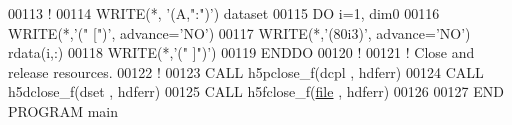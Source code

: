 \begin{DoxyCode}
00113   \textcolor{comment}{!}
00114   \textcolor{keyword}{WRITE}(*, \textcolor{stringliteral}{'(A,":")'}) dataset
00115   \textcolor{keywordflow}{DO} i=1, dim0
00116      \textcolor{keyword}{WRITE}(*,\textcolor{stringliteral}{'(" [")'}, advance=\textcolor{stringliteral}{'NO'})
00117      \textcolor{keyword}{WRITE}(*,\textcolor{stringliteral}{'(80i3)'}, advance=\textcolor{stringliteral}{'NO'}) rdata(i,:)
00118      \textcolor{keyword}{WRITE}(*,\textcolor{stringliteral}{'(" ]")'})
00119 \textcolor{keywordflow}{  ENDDO}
00120   \textcolor{comment}{!}
00121   \textcolor{comment}{! Close and release resources.}
00122   \textcolor{comment}{!}
00123   \textcolor{keyword}{CALL }h5pclose\_f(dcpl , hdferr)
00124   \textcolor{keyword}{CALL }h5dclose\_f(dset , hdferr)
00125   \textcolor{keyword}{CALL }h5fclose\_f(\hyperlink{structfile}{file} , hdferr)
00126 
00127 \textcolor{keyword}{END PROGRAM }main
\end{DoxyCode}
